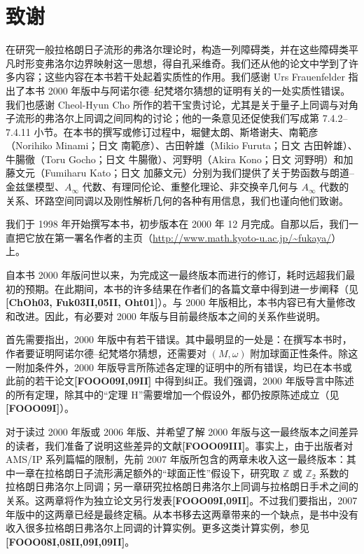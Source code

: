 
\section{致谢}
\label{sec:1-6}

在研究一般拉格朗日子流形的弗洛尔理论时，构造一列障碍类，并在这些障碍类平凡时形变弗洛尔边界映射这一思想，得自孔采维奇。我们还从他的论文中学到了许多内容；这些内容在本书若干处起着实质性的作用。我们感谢 Urs Frauenfelder 指出了本书 2000 年版中与阿诺尔德--纪梵塔尔猜想的证明有关的一处实质性错误。我们也感谢 Cheol-Hyun Cho 所作的若干宝贵讨论，尤其是关于量子上同调与对角子流形的弗洛尔上同调之间同构的讨论；他的一条意见还促使我们写成第 7.4.2--7.4.11 小节。在本书的撰写或修订过程中，堀健太朗、斯塔谢夫、南範彦（Norihiko Minami；日文 南範彦）、古田幹雄（Mikio Furuta；日文 古田幹雄）、牛腸徹（Toru Gocho；日文 牛腸徹）、河野明（Akira Kono；日文 河野明）和加藤文元（Fumiharu Kato；日文 加藤文元）分别为我们提供了关于势函数与朗道--金兹堡模型、$A_\infty$ 代数、有理同伦论、重整化理论、非交换辛几何与 $A_\infty$ 代数的关系、环路空间同调以及刚性解析几何的各种有用信息，我们也谨向他们致谢。

我们于 1998 年开始撰写本书，初步版本在 2000 年 12 月完成。自那以后，我们一直把它放在第一署名作者的主页（\url{http://www.math.kyoto-u.ac.jp/~fukaya/}）上。

自本书 2000 年版问世以来，为完成这一最终版本而进行的修订，耗时远超我们最初的预期。在此期间，本书的许多结果在作者们的各篇文章中得到进一步阐释（见\textbf{[ChOh03, Fuk03II,05II, Oht01]}）。与 2000 年版相比，本书内容已有大量修改和改进。因此，有必要对 2000 年版与目前最终版本之间的关系作些说明。

首先需要指出，2000 年版中有若干错误。其中最明显的一处是：在撰写本书时，作者要证明阿诺尔德--纪梵塔尔猜想，还需要对 $(M,\omega)$ 附加球面正性条件。除这一附加条件外，2000 年版导言所陈述各定理的证明中的所有错误，均已在本书或此前的若干论文\textbf{[FOOO09I,09II]} 中得到纠正。我们强调，2000 年版导言中陈述的所有定理，除其中的“定理 H”需要增加一个假设外，都仍按原陈述成立（见\textbf{[FOOO09I]}）。

对于读过 2000 年版或 2006 年版、并希望了解 2000 年版与这一最终版本之间差异的读者，我们准备了说明这些差异的文献\textbf{[FOOO09III]}。事实上，由于出版者对 AMS/IP 系列篇幅的限制，先前 2007 年版所包含的两章未收入这一最终版本：其中一章在拉格朗日子流形满足额外的“球面正性”假设下，研究取 $\mathbb Z$ 或 $\mathbb Z_2$ 系数的拉格朗日弗洛尔上同调；另一章研究拉格朗日弗洛尔上同调与拉格朗日手术之间的关系。这两章将作为独立论文另行发表\textbf{[FOOO09I,09II]}。不过我们要指出，2007 年版中的这两章已经是最终定稿。从本书移去这两章带来的一个缺点，是书中没有收入很多拉格朗日弗洛尔上同调的计算实例。更多这类计算实例，参见\textbf{[FOOO08I,08II,09I,09II]}。

